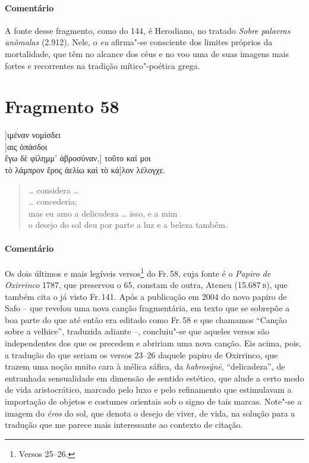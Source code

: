 {{\paragraph{Comentário} A fonte desse fragmento, como do 144, é Herodiano, no tratado \textit{Sobre
palavras anômalas} (2.912). Nele, o \textit{eu} afirma"-se consciente dos limites próprios da
mortalidade, que têm no alcance dos céus e no voo uma de suas imagens mais
fortes e recorrentes na tradição mítico"-poética grega.}


\section{Fragmento 58}

\begin{gkverse}
]ιμέναν νομίσδει\\
    ]αις ὀπάσδοι\\
ἔγω δὲ φίλημμ’ ἀβροσύναν,\qquad       ] τοῦτο καί μοι\\
τὸ λάμπρον ἔρος ἀελίω καὶ τὸ κά]λον λέλογχε.
\end{gkverse}

\begin{verse}
\ldots{} considera \ldots{}\\
\ldots{} concederia;\\
mas eu amo a delicadeza \ldots{} isso, e a mim\\
o desejo do sol deu por parte a luz e a beleza também.
\end{verse}

\medskip

{\paragraph{Comentário} Os dois últimos e mais legíveis versos\footnote{Versos 25--26.} do Fr.\,58, cuja fonte é o
\textit{Papiro de Oxirrinco} 1787, que preservou o 65, constam de outra, Ateneu (15.687\,\textsc{b}), que também cita o já visto Fr.\,141. Após a publicação em 2004 do
novo papiro de Safo -- que revelou uma nova canção fragmentária, em texto que se
sobrepõe a boa parte do que até então era editado como Fr.\,58 e que chamamos ``Canção sobre a velhice'', traduzida adiante --, concluiu"-se que aqueles
versos são independentes dos que os precedem e abririam uma nova canção. Eis acima, pois, a tradução do que seriam os versos 23--26 daquele papiro de Oxirrinco, que
trazem uma noção muito cara à mélica sáfica, da \textit{habrosýnē}, ``delicadeza'', de entranhada sensualidade em dimensão de sentido
estético, que alude a certo modo de vida aristocrático, marcado pelo luxo e pelo
refinamento que estimulavam a importação de objetos e costumes orientais
sob o signo de tais marcas. Note"-se a imagem do \textit{éros} do sol, que denota o desejo de viver, de vida, na solução para a tradução que me parece mais interessante ao contexto de citação.}



}
